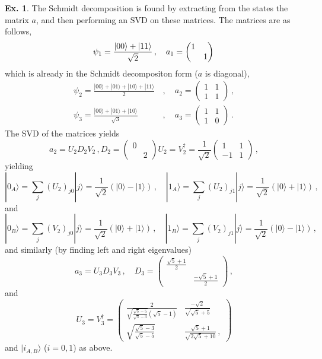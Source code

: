 \documentclass[a4paper,12pt]{article}
\theoremstyle{definition}
\newtheorem{exercise}{Ex.}[section]
\begin{document}
\begin{exercise}
 The Schmidt decomposition is found by extracting from the states the matrix $a$, and then performing an SVD on these matrices. The matrices are as follows,
 \[
   \psi_1 = \frac{|00\rangle + |11\rangle}{\sqrt{2}}\,,\quad a_1=\begin{pmatrix} 1 & \\ & 1\end{pmatrix}\\
 \]
 which is already in the Schmidt decompositon form ($a$ is diagonal),
 \[
  \begin{aligned}
   \psi_2 = \frac{|00\rangle + |01\rangle + |10\rangle + |11\rangle}{2}&\,,\quad a_2=\begin{pmatrix}1 & 1 \\ 1 & 1 \end{pmatrix}\,,\\
   \psi_3 = \frac{|00\rangle + |01\rangle + |10\rangle}{\sqrt{3}}&\,,\quad a_3 = \begin{pmatrix}1 & 1\\1 & 0\end{pmatrix}\,.
  \end{aligned}
 \]
 The SVD of the matrices yields
 \[
   a_2 = U_2 D_2 V_2\,, D_2=\begin{pmatrix}0 & \\ & 2 \end{pmatrix} U_2 = V_2^\dagger = \frac{1}{\sqrt{2}}\begin{pmatrix} 1 & 1 \\ -1 & 1 \end{pmatrix}\,,
 \]
 yielding
 \[
  |0_A\rangle = \sum_j (U_2)_{j0} |j\rangle = \frac{1}{\sqrt{2}}(|0\rangle - |1\rangle)\,,\quad |1_A\rangle = \sum_j (U_2)_{j1} |j\rangle = \frac{1}{\sqrt{2}}(|0\rangle + |1\rangle)\,,
 \]
 and
 \[
  |0_B\rangle  = \sum_j (V_2)_{j0} |j\rangle = \frac{1}{\sqrt{2}}(|0\rangle + |1\rangle)\,,\quad |1_B\rangle = \sum_j (V_2)_{j1} |j\rangle = \frac{1}{\sqrt{2}}(|0\rangle - |1\rangle)\,,
 \]
 and similarly (by finding left and right eigenvalues)
 \[
  a_3 = U_3 D_3 V_3\,,\quad D_3 = \begin{pmatrix} \frac{\sqrt{5}+1}{2} & \\ & \frac{-\sqrt{5}+1}{2} \end{pmatrix}\,,
 \]
 and
 \[
  U_3 = V_3^\dagger = 
  \begin{pmatrix}
   \frac{2}{\sqrt{\frac{\sqrt{5}-5}{\sqrt{5}-3}}(\sqrt{5}-1)} & \frac{-\sqrt{2}}{\sqrt{\sqrt{5}+5}} \\
   \sqrt{\frac{\sqrt{5}-3}{\sqrt{5}-5}} & \frac{\sqrt{5}+1}{\sqrt{2\sqrt{5}+10}}\,,
  \end{pmatrix}
 \]
 and $|i_{A,B}\rangle$ ($i=0,1$) as above.
\end{exercise}
\end{document}
